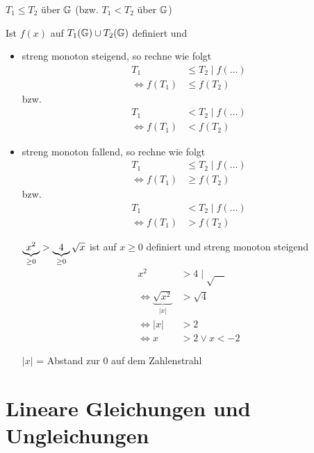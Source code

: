\begin{itemize}
\begin{enumerate}
		 $T_1 \le T_2$ über $\mathbb{G}$
		(bzw. $T_1 < T_2$ über $\mathbb{G}$)
		
		Ist $f(x)$ auf $T_1(\mathbb{G})\cup T_2(\mathbb{G})$ definiert und
		\begin{itemize}
			\item streng monoton steigend, so rechne wie folgt\\
			\begin{align*}
			T_1 &\le T_2\mid f(\ldots)\\
			\Leftrightarrow f(T_1) &\le f(T_2)
			\end{align*}
			bzw.
			\begin{align*}
			T_1 &< T_2\mid f(\ldots)\\
			\Leftrightarrow f(T_1) &< f(T_2)
			\end{align*}
			
			\item streng monoton fallend, so rechne wie folgt\\
			\begin{align*}
			T_1 &\le T_2\mid f(\ldots)\\
			\Leftrightarrow f(T_1) &\ge f(T_2)
			\end{align*}
			bzw.
			\begin{align*}
			T_1 &< T_2\mid f(\ldots)\\
			\Leftrightarrow f(T_1) &> f(T_2)
			\end{align*}
			
			\Bsp $\underbrace{x^2}_{\ge0} > \underbrace{4}_{\ge0}\\\sqrt{x}$ ist auf $x\ge0$ definiert und streng monoton steigend
			\begin{align*}
			x^2 & > 4\mid\sqrt{\quad}\\
			\Leftrightarrow \underbrace{\sqrt{x^2}}_{|x|} & > \sqrt{4}\\
			\Leftrightarrow |x| & > 2\\
			\Leftrightarrow x &> 2 \lor x < -2
			\end{align*}
			
			 $|x|$ = Abstand zur 0 auf dem Zahlenstrahl
			
		\end{itemize}
	\end{enumerate}
\end{itemize}

\clearpage
\section{Lineare Gleichungen und Ungleichungen}

